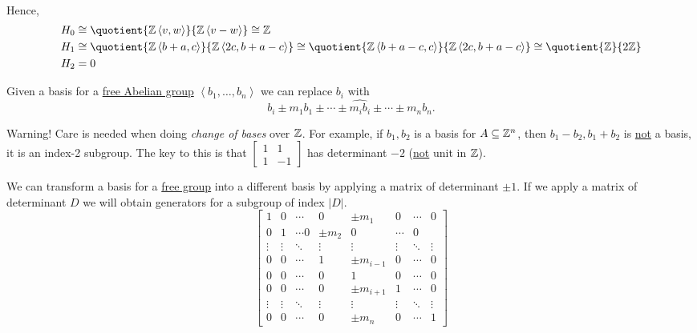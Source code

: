 \begin{eg}
\[\begin{alignedat}{3}
		\end{alignedat}
	\]
	Hence,
	\[
		\begin{split}
			H_0 &\cong \quotient{\mathbb{\MakeUppercase{z}} \left< v, w \right> }{\mathbb{\MakeUppercase{z}} \left< v - w \right> } \cong \mathbb{\MakeUppercase{z}}\\
			H_1 &\cong \quotient{\mathbb{\MakeUppercase{z}} \left< b + a, c \right> }{\mathbb{\MakeUppercase{z}} \left< 2c, b+a-c \right> } \cong \quotient{\mathbb{\MakeUppercase{z}} \left< b + a - c, c \right> }{\mathbb{\MakeUppercase{z}} \left< 2c, b+a-c \right> } \cong \quotient{\mathbb{\MakeUppercase{z}} }{2\mathbb{\MakeUppercase{z}}}\\
			H_2 &= 0\\
		\end{split}
	\]
\end{eg}

\begin{remark}
	Given a basis for a \hyperref[def:free-Abelian-group]{free Abelian group} \(\left<  b_1, \ldots, b_n  \right>\) we can replace \(b_{i} \) with
	\[
		b_i \pm m_1b_1 \pm \cdots \pm \widehat{m_ib_i} \pm \cdots \pm m_n b_n.
	\]
\end{remark}

\begin{remark}
	Warning! Care is needed when doing \emph{change of bases} over \(\mathbb{\MakeUppercase{z}} \). For example,
	if \(b_1, b_2\) is a basis for \(A \subseteq \mathbb{\MakeUppercase{z}} ^n\), then \(b_1 - b_2, b_1 + b_2\) is \underline{not} a basis, it is an index-2 subgroup.
	The key to this is that \(\begin{bmatrix} 1 & 1 \\ 1 & -1 \end{bmatrix}\) has determinant \(-2\) (\underline{not} unit in \(\mathbb{\MakeUppercase{z}} \)).
\end{remark}

We can transform a basis for a \hyperref[def:free-group]{free group} into a different basis by applying a matrix of determinant \(\pm 1\).
If we apply a matrix of determinant \(D\) we will obtain generators for a subgroup of index \(\left\vert D \right\vert \).
\[
	\begin{bmatrix}
		1      & 0      & \cdots   & 0       & \pm m_1       & 0      & \cdots & 0      \\
		0      & 1      & \cdots 0 & \pm m_2 & 0             & \cdots & 0               \\
		\vdots & \vdots & \ddots   & \vdots  & \vdots        & \vdots & \ddots & \vdots \\
		0      & 0      & \cdots   & 1       & \pm m_{i - 1} & 0      & \cdots & 0      \\
		0      & 0      & \cdots   & 0       & 1             & 0      & \cdots & 0      \\
		0      & 0      & \cdots   & 0       & \pm m_{i + 1} & 1      & \cdots & 0      \\
		\vdots & \vdots & \ddots   & \vdots  & \vdots        & \vdots & \ddots & \vdots \\
		0      & 0      & \cdots   & 0       & \pm m_n       & 0      & \cdots & 1
	\end{bmatrix}
\]


